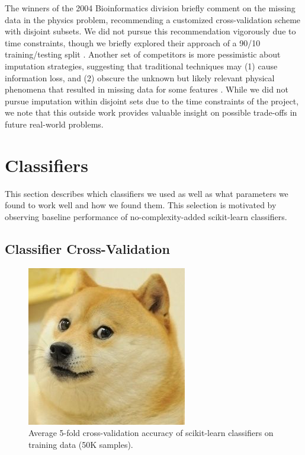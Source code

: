 \documentclass{article}
\begin{document}
The winners of the 2004 Bioinformatics division briefly comment on the missing data in the physics problem, recommending a customized cross-validation scheme with disjoint subsets. 
We did not pursue this recommendation vigorously due to time constraints, though we briefly explored their approach of a 90/10 training/testing split \cite{pfahringer2004weka}.
Another set of competitors is more pessimistic about imputation strategies, suggesting that traditional techniques may (1) cause information loss, and (2) obscure the unknown but likely relevant physical phenomena that resulted in missing data for some features \cite{vogel2004anti}.
While we did not pursue imputation within disjoint sets due to the time constraints of the project, we note that this outside work provides valuable insight on possible trade-offs in future real-world problems.


\section{Classifiers}

This section describes which classifiers we used as well as what parameters we found to work well and how we found them. 
This selection is motivated by observing baseline performance of no-complexity-added scikit-learn classifiers.


\subsection{Classifier Cross-Validation}

\begin{figure}
\centering
\includegraphics{placeholder}
\caption{Average 5-fold cross-validation accuracy of scikit-learn classifiers on training data (50K samples).}
\label{fig:crossval}
\end{figure}
\end{document}
